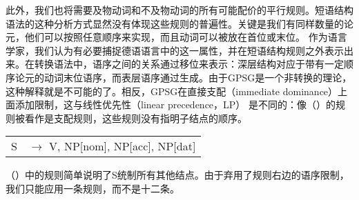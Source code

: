 \noindent
此外，我们也将需要及物动词和不及物动词的所有可能配价的平行规则。短语结构语法的这种分析方式显然没有体现这些规则的普遍性。关键是我们有同样数量的论元，他们可以按照任意顺序来实现，而且动词可以被放在首位或末位。
作为语言学家，我们认为有必要捕捉德语语言中的这一属性，并在短语结构规则之外表示出来。在转换语法中，语序之间的关系通过移位来表示：深层结构对应于带有一定顺序论元的动词末位语序，而表层语序通过\movealphac 生成。由于GPSG是一个非转换的理论，这种解释就是不可能的了。相反，GPSG在直接支配（immediate dominance）上面添加限制，这与线性优先性（linear precedence，LP） 是不同的：像（）的规则被看作是支配规则，这些规则没有指明子结点的顺序\citep{Pullum82a}。
\ea
\begin{tabular}[t]{@{}l@{ }l}
S  & $\to$ V, NP[nom], NP[acc], NP[dat]\\
\end{tabular}
\z
（）中的规则简单说明了S统制所有其他结点。由于弃用了规则右边的语序限制，我们只能应用一条规则，而不是十二条。

